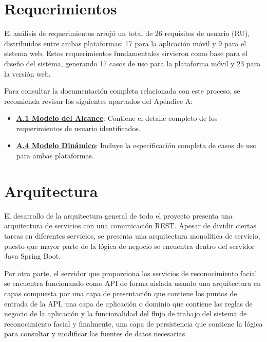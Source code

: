 





\section{Requerimientos}
El análisis de requerimientos arrojó un total de 26 requisitos de usuario (RU), distribuidos entre ambas plataformas: 17 para la aplicación móvil y 9 para el sistema web. Estos requerimientos fundamentales sirvieron como base para el diseño del sistema, generando 17 casos de uso para la plataforma móvil y 23 para la versión web.

Para consultar la documentación completa relacionada con este proceso, se recomienda revisar los siguientes apartados del Apéndice A:

\begin{itemize}
	\item \hyperref[cap:reqUsr]{\textbf{A.1 Modelo del Alcance}}: Contiene el detalle completo de los requerimientos de usuario identificados.
	\item \hyperref[cap:modDinamico]{\textbf{A.4 Modelo Dinámico}}: Incluye la especificación completa de casos de uso para ambas plataformas.
\end{itemize}


\section{Arquitectura}
El desarrollo de la arquitectura general de todo el proyecto presenta una arquitectura de servicios con una comunicación REST. Apesar de dividir ciertas tareas en diferentes servicios, se presenta una arquitectura monolítica de servicio, puesto que mayor parte de la lógica de negocio se encuentra dentro del servidor Java Spring Boot.

Por otra parte, el servidor que proporciona los servicios de reconocimiento facial se encuentra funcionando como API de forma aislada usando una arquitectura en capas compuesta por una capa de presentación que contiene los puntos de entrada de la API, una capa de aplicación o dominio que contiene las reglas de negocio de la aplicación y la funcionalidad del flujo de trabajo del sistema de reconocimiento facial y finalmente, una capa de persistencia que contiene la lógica para consultar y modificar las fuentes de datos necesarias.

